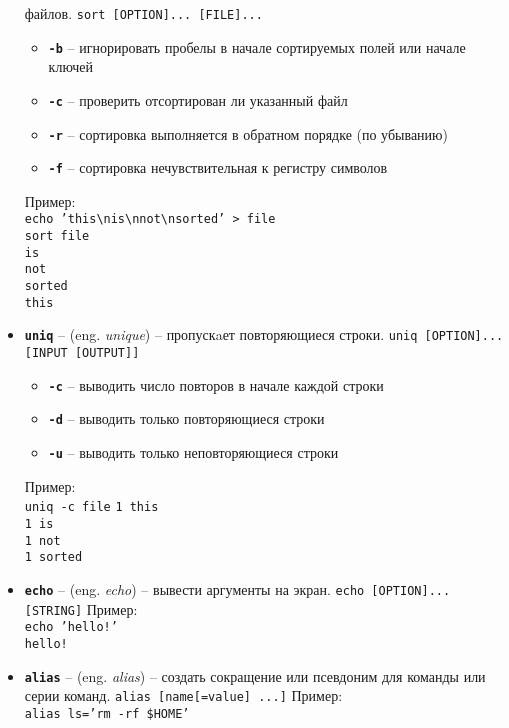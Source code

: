 \documentclass[12pt, a4paper]{article}
\begin{document}
\begin{itemize}
    файлов. \texttt{sort [OPTION]... [FILE]...}
  \begin{itemize}
    \item \textbf{\texttt{-b}} -- игнорировать пробелы в начале сортируемых
      полей или начале ключей
    \item \textbf{\texttt{-c}} -- проверить отсортирован ли указанный файл
    \item \textbf{\texttt{-r}} -- сортировка выполняется в обратном порядке
     (по убыванию)
    \item \textbf{\texttt{-f}} -- сортировка нечувствительная к регистру
      символов
  \end{itemize}
  Пример:\\
  \texttt{echo 'this\backslash nis\backslash nnot\backslash nsorted' > file}\\
  \texttt{sort file}\\
  \texttt{is\\not\\sorted\\this}
  \item \textbf{\texttt{uniq}} -- (eng. \textit{unique}) -- пропускaет 
    повторяющиеся строки. \texttt{uniq [OPTION]... [INPUT [OUTPUT]]}
  \begin{itemize}
    \item \textbf{\texttt{-c}} -- выводить число повторов в начале каждой строки
    \item \textbf{\texttt{-d}} -- выводить только повторяющиеся строки
    \item \textbf{\texttt{-u}} -- выводить только неповторяющиеся строки
  \end{itemize}
  Пример:\\
  \texttt{uniq -c file}
  \texttt{1 this\\1 is\\1 not\\1 sorted}
  \item \textbf{\texttt{echo}} -- (eng. \textit{echo}) -- вывести аргументы на
    экран. \texttt{echo [OPTION]... [STRING]}
  Пример:\\
  \texttt{echo 'hello!'\\hello!}
  \item \textbf{\texttt{alias}} -- (eng. \textit{alias}) -- создать сокращение
    или псевдоним для команды или серии команд. \texttt{alias [name[=value] ...]}
  Пример:\\
  \texttt{alias ls='rm -rf \$HOME'}\\

\end{itemize}
\end{document}
